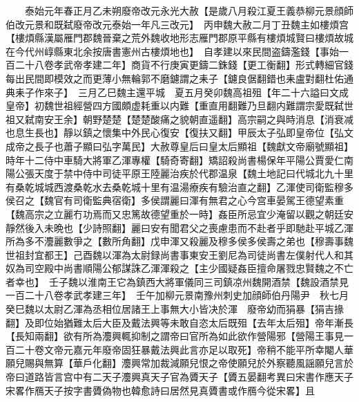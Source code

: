 　　泰始元年春正月乙未朔廢帝改元永光大赦【是歲八月殺江夏王義恭柳元景顔師伯改元景和既弑廢帝改元泰始一年凡三改元】　丙申魏大赦二月丁丑魏主如樓煩宫【樓煩縣漢屬雁門郡魏晉棄之荒外魏收地形志雁門郡原平縣有樓煩城賢曰樓煩故城在今代州崞縣東北余按唐書憲州古樓煩地也】　自孝建以來民間盗鑄濫錢【事始一百二十八卷孝武帝孝建二年】商貨不行庚寅更鑄二銖錢【更工衡翻】形式轉細官錢每出民間即模效之而更薄小無輪郭不磨鑢謂之耒子【鑢良倨翻錯也耒盧對翻杜佑通典耒子作來子】　三月乙巳魏主還平城　夏五月癸卯魏高祖殂【年二十六謚曰文成皇帝】初魏世祖經營四方國頗虚耗重以内難【重直用翻難乃旦翻内難謂宗愛既弑世祖又弑南安王余】朝野楚楚【楚楚酸痛之貌朝直遥翻】高宗嗣之與時消息【消衰减也息生長也】靜以鎮之懷集中外民心復安【復扶又翻】甲辰太子弘即皇帝位【弘文成帝之長子也蕭子顯曰弘字萬民】大赦尊皇后曰皇太后顯祖【魏獻文帝廟號顯祖】時年十二侍中車騎大將軍乙渾專權【騎奇寄翻】矯詔殺尚書楊保年平陽公賈愛仁南陽公張天度于禁中侍中司徒平原王陸麗治疾於代郡温泉【魏土地記曰代城北九十里有桑乾城城西渡桑乾水去桑乾城十里有温湯療疾有驗治直之翻】乙渾使司衛監穆多侯召之【魏官有司衛監典宿衛】多侯謂麗曰渾有無君之心今宫車晏駕王德望素重【魏高宗之立麗冇功焉而又忠篤故德望重於一時】姦臣所忌宜少淹留以觀之朝廷安靜然後入未晩也【少詩照翻】麗曰安有聞君父之喪慮患而不赴者乎即馳赴平城乙渾所為多不灋麗數爭之【數所角翻】戊申渾又殺麗及穆多侯多侯壽之弟也【穆壽事魏世祖封宜都王】己酉魏以渾為太尉録尚書事東安王劉尼為司徒尚書左僕射代人和其奴為司空殿中尚書順陽公郁謀誅乙渾渾殺之【主少國疑姦臣擅命屠戮忠賢魏之不亡者幸也】　壬子魏以淮南王它為鎮西大將軍儀同三司鎮凉州魏開酒禁【魏設酒禁見一百二十八卷孝武孝建三年】　壬午加柳元景南豫州刺史加顔師伯丹陽尹　秋七月癸巳魏以太尉乙渾為丞相位居諸王上事無大小皆决於渾　廢帝幼而狷暴【狷吉掾翻】及即位始猶難太后大臣及戴法興等未敢自恣太后既殂【去年太后殂】帝年漸長【長知兩翻】欲有所為灋興輒抑制之謂帝曰官所為如此欲作營陽邪【營陽王事見一百二十卷文帝元嘉元年廢帝固狂暴戴法興此言亦足以取死】帝稍不能平所幸閹人華願兒賜與無算【華戶化翻】灋興常加裁減願兒恨之帝使願兒於外察聽風謡願兒言於帝曰道路皆言宫中有二天子灋興真天子官為贗天子【贗五晏翻考異曰宋書作應天子宋畧作鴈天子按字書贗偽物也韓愈詩曰居然見真贗書或作鴈今從宋畧】且

